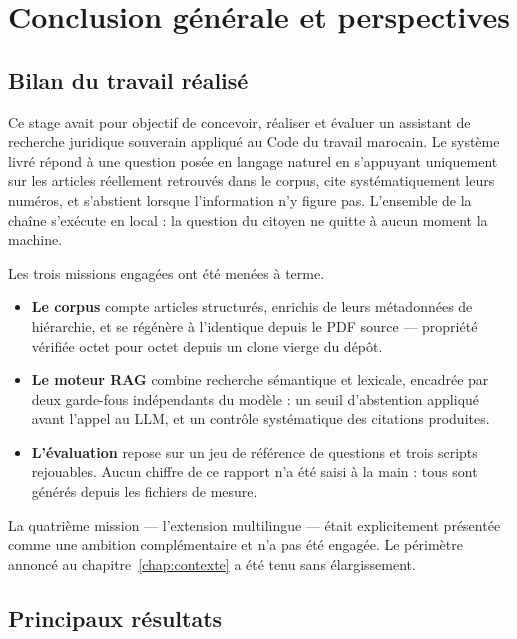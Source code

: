 \chapter*{Conclusion générale et perspectives}

\section*{Bilan du travail réalisé}

Ce stage avait pour objectif de concevoir, réaliser et évaluer un assistant de recherche juridique
souverain appliqué au Code du travail marocain. Le système livré répond à une question posée en
langage naturel en s'appuyant uniquement sur les articles réellement retrouvés dans le corpus,
cite systématiquement leurs numéros, et s'abstient lorsque l'information n'y figure pas.
L'ensemble de la chaîne s'exécute en local : la question du citoyen ne quitte à aucun moment la
machine.

Les trois missions engagées ont été menées à terme.

\begin{itemize}
  \item \textbf{Le corpus} compte \NbArticles{} articles structurés, enrichis de leurs métadonnées
        de hiérarchie, et se régénère à l'identique depuis le PDF source --- propriété vérifiée
        octet pour octet depuis un clone vierge du dépôt.
  \item \textbf{Le moteur RAG} combine recherche sémantique et lexicale, encadrée par deux
        garde-fous indépendants du modèle : un seuil d'abstention appliqué avant l'appel au LLM, et
        un contrôle systématique des citations produites.
  \item \textbf{L'évaluation} repose sur un jeu de référence de \NbQuestions{} questions et trois
        scripts rejouables. Aucun chiffre de ce rapport n'a été saisi à la main : tous sont générés
        depuis les fichiers de mesure.
\end{itemize}

La quatrième mission --- l'extension multilingue --- était explicitement présentée comme une
ambition complémentaire et n'a pas été engagée. Le périmètre annoncé au chapitre~\ref{chap:contexte}
a été tenu sans élargissement.

\section*{Principaux résultats}

